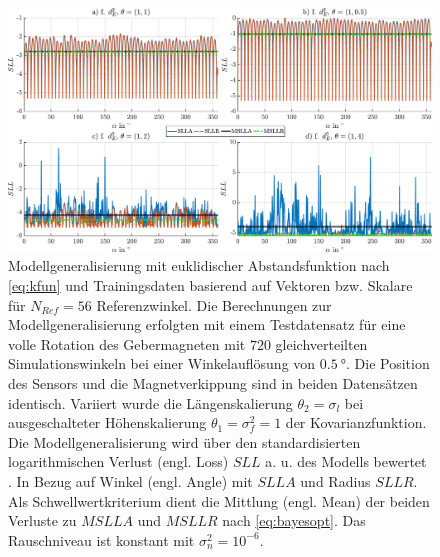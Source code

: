 \clearpage
\begin{figure}[tph]
\centering
\includegraphics[width=\linewidth]{chapters/images/4-EuOExp/Vergleich-QFCAPX-SLL}
\caption[Modellgeneralisierung mit euklidischer Abstandsfunktion]{Modellgeneralisierung mit euklidischer Abstandsfunktion nach \autoref{eq:kfun} und Trainingsdaten basierend auf Vektoren bzw. Skalare für $N_{Ref} = 56$ Referenzwinkel. Die Berechnungen zur Modellgeneralisierung erfolgten mit einem Testdatensatz für eine volle Rotation des Gebermagneten mit $720$ gleichverteilten Simulationswinkeln bei einer Winkelauflösung von $\SI{0,5}{\degree}$. Die Position des Sensors und die Magnetverkippung sind in beiden Datensätzen identisch. Variiert wurde die Längenskalierung $\theta_2 = \sigma_l$ bei ausgeschalteter Höhenskalierung $\theta_1 = \sigma_f^2 = 1$ der Kovarianzfunktion. Die Modellgeneralisierung wird über den standardisierten logarithmischen Verlust (engl. Loss) $SLL$ a. u. des Modells bewertet \cite{Rasmussen2006}. In Bezug auf Winkel (engl. Angle) mit $SLLA$ und Radius $SLLR$. Als Schwellwertkriterium dient die Mittlung (engl. Mean) der beiden Verluste zu $MSLLA$ und $MSLLR$ nach \autoref{eq:bayesopt}. Das Rauschniveau ist konstant mit $\sigma_n^2 = 10^{-6}$.}
\label{fig:vergleich-qfcapx-sll}
\end{figure}
\clearpage

